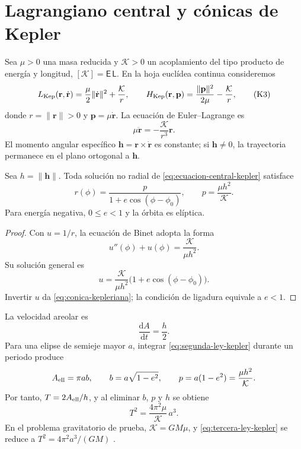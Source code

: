 \section{Lagrangiano central y cónicas de Kepler}
\label{sec:lagrangiano-central-kepler}

Sea \(\mu>0\) una masa reducida y
\(\mathcal K>0\) un acoplamiento del tipo producto de energía y longitud,
\([\mathcal K]=\mathsf E\,\mathsf L\). En la hoja
euclídea continua consideremos
\[
 L_{\rm Kep}(\mathbf r,\dot{\mathbf r})
 =\frac{\mu}{2}\|\dot{\mathbf r}\|^2+\frac{\mathcal K}{r},
 \qquad
 H_{\rm Kep}(\mathbf r,\mathbf p)
 =\frac{\|\mathbf p\|^2}{2\mu}-\frac{\mathcal K}{r},
 \tag{K3}\label{eq:lagrangiano-hamiltoniano-kepler}
\]
donde \(r=\|\mathbf r\|>0\) y
\(\mathbf p=\mu\dot{\mathbf r}\). La ecuación de Euler--Lagrange es
\[
 \mu\ddot{\mathbf r}
 =-\frac{\mathcal K}{r^3}\mathbf r.
 \tag{K4}\label{eq:ecuacion-central-kepler}
\]
El momento angular específico
\(\mathbf h=\mathbf r\times\dot{\mathbf r}\) es constante; si
\(\mathbf h\ne0\), la trayectoria permanece en el plano ortogonal a
\(\mathbf h\).

\begin{proposition}
\label{prop:conica-kepleriana-hmt-md}
Sea \(h=\|\mathbf h\|\). Toda solución no radial de
\eqref{eq:ecuacion-central-kepler} satisface
\[
 r(\phi)
 =\frac{p}{1+e\cos(\phi-\phi_0)},
 \qquad
 p=\frac{\mu h^2}{\mathcal K}.
 \tag{K5}\label{eq:conica-kepleriana}
\]
Para energía negativa, \(0\leq e<1\) y la órbita es elíptica.
\end{proposition}

\begin{proof}
Con \(u=1/r\), la ecuación de Binet adopta la forma
\[
 u''(\phi)+u(\phi)=\frac{\mathcal K}{\mu h^2}.
\]
Su solución general es
\[
 u=\frac{\mathcal K}{\mu h^2}
 \bigl(1+e\cos(\phi-\phi_0)\bigr).
\]
Invertir \(u\) da \eqref{eq:conica-kepleriana}; la condición de ligadura
equivale a \(e<1\).
\end{proof}

La velocidad areolar es
\[
 \frac{\mathrm dA}{\mathrm dt}=\frac h2.
 \tag{K6}\label{eq:segunda-ley-kepler}
\]
Para una elipse de semieje mayor \(a\), integrar
\eqref{eq:segunda-ley-kepler} durante un periodo produce
\[
 A_{\rm ell}=\pi ab,
 \qquad
 b=a\sqrt{1-e^2},
 \qquad
 p=a(1-e^2)=\frac{\mu h^2}{\mathcal K}.
\]
Por tanto,
\(T=2A_{\rm ell}/h\), y al eliminar \(b\), \(p\) y \(h\) se obtiene
\[
 T^2=\frac{4\pi^2\mu}{\mathcal K}\,a^3.
 \tag{K7}\label{eq:tercera-ley-kepler}
\]
En el problema gravitatorio de prueba,
\(\mathcal K=G M\mu\), y
\eqref{eq:tercera-ley-kepler} se reduce a
\(T^2=4\pi^2a^3/(GM)\) \cite{Kepler1609,Newton1687}.

